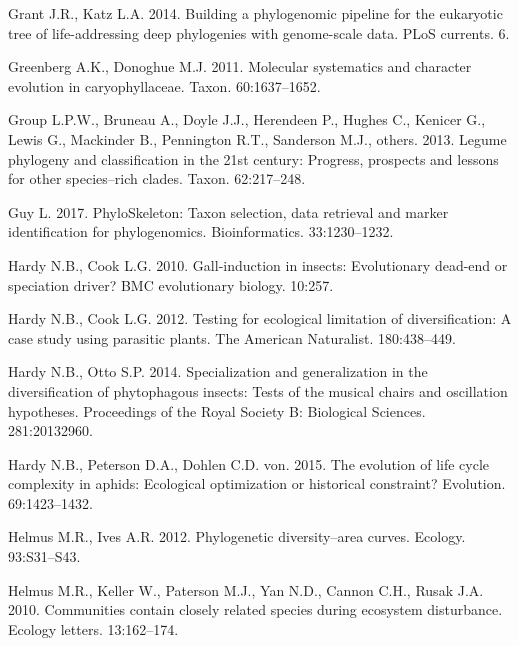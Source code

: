 \documentclass[]{article}
\begin{document}
\leavevmode\hypertarget{ref-grant2014building}{}%
Grant J.R., Katz L.A. 2014. Building a phylogenomic pipeline for the eukaryotic tree of life-addressing deep phylogenies with genome-scale data. PLoS currents. 6.

\leavevmode\hypertarget{ref-greenberg2011caryophyllaceae}{}%
Greenberg A.K., Donoghue M.J. 2011. Molecular systematics and character evolution in caryophyllaceae. Taxon. 60:1637--1652.

\leavevmode\hypertarget{ref-legume2013legume}{}%
Group L.P.W., Bruneau A., Doyle J.J., Herendeen P., Hughes C., Kenicer G., Lewis G., Mackinder B., Pennington R.T., Sanderson M.J., others. 2013. Legume phylogeny and classification in the 21st century: Progress, prospects and lessons for other species--rich clades. Taxon. 62:217--248.

\leavevmode\hypertarget{ref-guy2017phyloskeleton}{}%
Guy L. 2017. PhyloSkeleton: Taxon selection, data retrieval and marker identification for phylogenomics. Bioinformatics. 33:1230--1232.

\leavevmode\hypertarget{ref-hardy2010gall}{}%
Hardy N.B., Cook L.G. 2010. Gall-induction in insects: Evolutionary dead-end or speciation driver? BMC evolutionary biology. 10:257.

\leavevmode\hypertarget{ref-hardy2012testing}{}%
Hardy N.B., Cook L.G. 2012. Testing for ecological limitation of diversification: A case study using parasitic plants. The American Naturalist. 180:438--449.

\leavevmode\hypertarget{ref-hardy2014specialization}{}%
Hardy N.B., Otto S.P. 2014. Specialization and generalization in the diversification of phytophagous insects: Tests of the musical chairs and oscillation hypotheses. Proceedings of the Royal Society B: Biological Sciences. 281:20132960.

\leavevmode\hypertarget{ref-hardy2015evolution}{}%
Hardy N.B., Peterson D.A., Dohlen C.D. von. 2015. The evolution of life cycle complexity in aphids: Ecological optimization or historical constraint? Evolution. 69:1423--1432.

\leavevmode\hypertarget{ref-helmus2012phylogenetic}{}%
Helmus M.R., Ives A.R. 2012. Phylogenetic diversity--area curves. Ecology. 93:S31--S43.

\leavevmode\hypertarget{ref-helmus2010communities}{}%
Helmus M.R., Keller W., Paterson M.J., Yan N.D., Cannon C.H., Rusak J.A. 2010. Communities contain closely related species during ecosystem disturbance. Ecology letters. 13:162--174.
\end{document}
